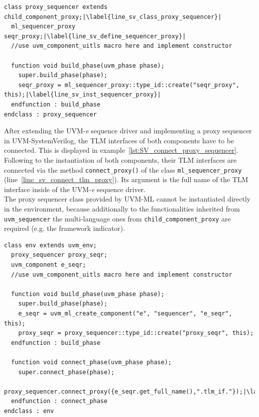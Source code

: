 \lstset{language=SystemVerilog, numbers = left, escapechar=|, breaklines=true}
\begin{lstlisting}[frame=htrbl, caption={SystemVerilog: creating a proxy sequencer},
label={lst:SV_proxy_sequencer}]
class proxy_sequencer extends child_component_proxy;|\label{line_sv_class_proxy_sequencer}|
  ml_sequencer_proxy seqr_proxy;|\label{line_sv_define_sequencer_proxy}|
  //use uvm_component_uitls macro here and implement constructor
  
  function void build_phase(uvm_phase phase);
    super.build_phase(phase);
    seqr_proxy = ml_sequencer_proxy::type_id::create("seqr_proxy", this);|\label{line_sv_inst_sequencer_proxy}|
  endfunction : build_phase
endclass : proxy_sequencer
\end{lstlisting}
After extending the UVM-\textit{e} sequence driver and implementing a proxy sequencer in UVM-SystemVerilog, the TLM interfaces of both components have to be connected. This is displayed in example~\ref{lst:SV_connect_proxy_sequencer}. Following to the instantiation of both components, their TLM interfaces are connected via the method \lstinline$connect_proxy()$ of the class \lstinline$ml_sequencer_proxy$ (line~\ref{line_sv_connect_tlm_proxy}). Its argument is the full name of the TLM interface inside of the UVM-\textit{e} sequence driver.\\
The proxy sequencer class provided by UVM-ML cannot be instantiated directly in the environment, because additionally to the functionalities inherited from \lstinline$uvm_sequencer$ the multi-language ones from \lstinline$child_component_proxy$ are required (e.g. the framework indicator).
\lstset{language=SystemVerilog, numbers = left, escapechar=|, breaklines=true}
\begin{lstlisting}[frame=htrbl, caption={SystemVerilog: connecting proxy sequencer and foreign sequencer},
label={lst:SV_connect_proxy_sequencer}]
class env extends uvm_env;
  proxy_sequencer proxy_seqr;
  uvm_component e_seqr;
  //use uvm_component_uitls macro here and implement constructor
  
  function void build_phase(uvm_phase phase);
    super.build_phase(phase);
    e_seqr = uvm_ml_create_component("e", "sequencer", "e_seqr", this);
    proxy_seqr = proxy_sequencer::type_id::create("proxy_seqr", this);
  endfunction : build_phase
  
  function void connect_phase(uvm_phase phase);
    super.connect_phase(phase);
    proxy_sequencer.connect_proxy({e_seqr.get_full_name(),".tlm_if."});|\label{line_sv_connect_tlm_proxy}|
  endfunction : connect_phase
endclass : env
\end{lstlisting}
